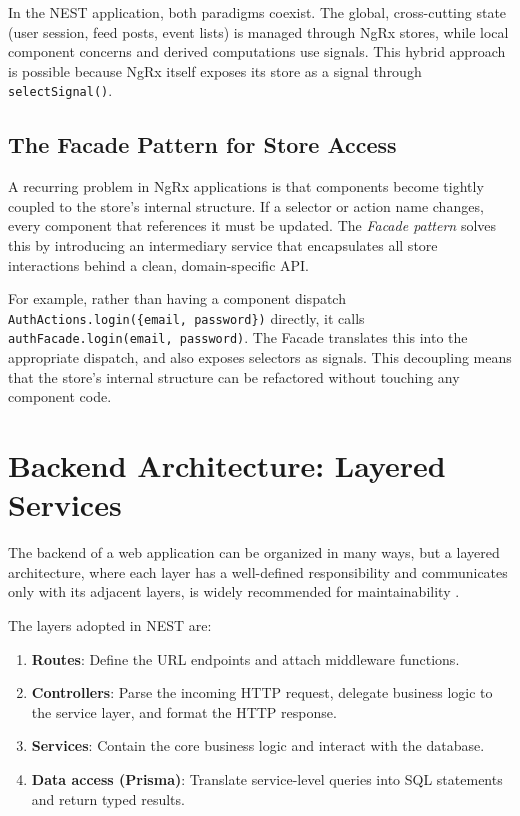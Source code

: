In the NEST application, both paradigms coexist. The global, cross-cutting state (user session, feed posts, event lists) is managed through NgRx stores, while local component concerns and derived computations use signals. This hybrid approach is possible because NgRx itself exposes its store as a signal through \texttt{selectSignal()}.

\subsection{The Facade Pattern for Store Access}

A recurring problem in NgRx applications is that components become tightly coupled to the store's internal structure. If a selector or action name changes, every component that references it must be updated. The \textit{Facade pattern} \cite{gamma1994design} solves this by introducing an intermediary service that encapsulates all store interactions behind a clean, domain-specific API.

For example, rather than having a component dispatch \texttt{AuthActions.login(\{email, password\})} directly, it calls \texttt{authFacade.login(email, password)}. The Facade translates this into the appropriate dispatch, and also exposes selectors as signals. This decoupling means that the store's internal structure can be refactored without touching any component code.

\section{Backend Architecture: Layered Services}

The backend of a web application can be organized in many ways, but a layered architecture, where each layer has a well-defined responsibility and communicates only with its adjacent layers, is widely recommended for maintainability \cite{fowler2002patterns}.

The layers adopted in NEST are:

\begin{enumerate}[nosep]
  \item \textbf{Routes}: Define the URL endpoints and attach middleware functions.
  \item \textbf{Controllers}: Parse the incoming HTTP request, delegate business logic to the service layer, and format the HTTP response.
  \item \textbf{Services}: Contain the core business logic and interact with the database.
  \item \textbf{Data access (Prisma)}: Translate service-level queries into SQL statements and return typed results.
\end{enumerate}

